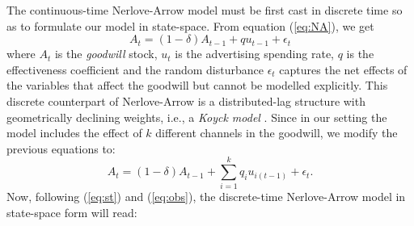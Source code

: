 The continuous-time Nerlove-Arrow model must be first cast in discrete time so as to formulate our model in state-space. From equation (\ref{eq:NA}), we get
$$
A_t =  (1-\delta) A_{t-1} + q u_{t-1} + \epsilon_t 
$$
where $A_t$ is the \emph{goodwill} stock, $u_t$ is the advertising spending rate, $q$ is the effectiveness coefficient and the random disturbance $\epsilon_t$  captures the net effects of the variables that affect the goodwill  but cannot be modelled explicitly.  This discrete counterpart of Nerlove-Arrow is a distributed-lag structure with geometrically declining weights, i.e., a \emph{Koyck model} \parencite{clarke1976econometric, koyck1954distributed}. Since in our setting the model includes the effect of $k$ different channels in the goodwill, we modify the previous equations to:
$$
A_t =  (1-\delta) A_{t-1} + \sum_{i=1}^k q_i u_{i(t-1)} + \epsilon_t.
$$
Now, following  (\ref{eq:st}) and (\ref{eq:obs}), the discrete-time Nerlove-Arrow model in state-space form will read:
